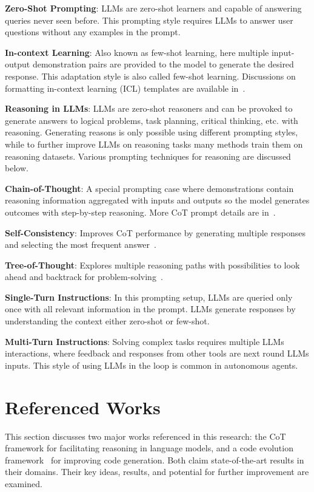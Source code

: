 \documentclass[a4paper,oneside]{book}
\begin{document}
\textbf{Zero-Shot Prompting}: LLMs are zero-shot learners and capable of answering queries never seen before. This prompting style requires LLMs to answer user questions without any examples in the prompt.

\textbf{In-context Learning}: Also known as few-shot learning, here multiple input-output demonstration pairs are provided to the model to generate the desired response. This adaptation style is also called few-shot learning. Discussions on formatting in-context learning (ICL) templates are available in~\cite{dong2022survey}.

\textbf{Reasoning in LLMs}: LLMs are zero-shot reasoners and can be provoked to generate answers to logical problems, task planning, critical thinking, etc. with reasoning. Generating reasons is only possible using different prompting styles, while to further improve LLMs on reasoning tasks many methods train them on reasoning datasets. Various prompting techniques for reasoning are discussed below.

\textbf{Chain-of-Thought}: A special prompting case where demonstrations contain reasoning information aggregated with inputs and outputs so the model generates outcomes with step-by-step reasoning. More CoT prompt details are in~\cite{huang2022towards}.

\textbf{Self-Consistency}: Improves CoT performance by generating multiple responses and selecting the most frequent answer~\cite{wang2022self}.

\textbf{Tree-of-Thought}: Explores multiple reasoning paths with possibilities to look ahead and backtrack for problem-solving~\cite{yao2023tree}.

\textbf{Single-Turn Instructions}: In this prompting setup, LLMs are queried only once with all relevant information in the prompt. LLMs generate responses by understanding the context either zero-shot or few-shot.

\textbf{Multi-Turn Instructions}: Solving complex tasks requires multiple LLMs interactions, where feedback and responses from other tools are next round LLMs inputs. This style of using LLMs in the loop is common in autonomous agents.

\chapter{Referenced Works}
This section discusses two major works referenced in this research: the CoT framework for facilitating reasoning in language models, and a code evolution framework~\cite{jiang2023selfevolve} for improving code generation. Both claim state-of-the-art results in their domains. Their key ideas, results, and potential for further improvement are examined.
\end{document}
